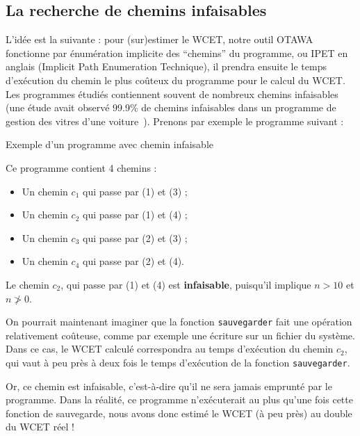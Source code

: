 \documentclass[french]{article}
\begin{document}
  \subsection{La recherche de chemins infaisables}
  L'idée est la suivante : pour (sur)estimer le WCET, notre outil OTAWA fonctionne par énumération implicite des ``chemins'' du programme, ou IPET en anglais (Implicit Path Enumeration Technique), il prendra ensuite le temps d'exécution du chemin le plus coûteux du programme pour le calcul du WCET. Les programmes étudiés contiennent souvent de nombreux chemins infaisables (une étude avait observé 99.9\% de chemins infaisables dans un programme de gestion des vitres d'une voiture~\cite{wcet05}). Prenons par exemple le programme suivant :

  \begin{algorithm}
    \label{alg:1}
    \caption{Exemple d'un programme avec chemin infaisable}
  \end{algorithm}

  Ce programme contient 4 chemins :
  \begin{itemize}
    \item Un chemin $c_1$ qui passe par (1) et (3) ;
    \item Un chemin $c_2$ qui passe par (1) et (4) ;
    \item Un chemin $c_3$ qui passe par (2) et (3) ;
    \item Un chemin $c_4$ qui passe par (2) et (4).
  \end{itemize}

  Le chemin $c_2$, qui passe par (1) et (4) est \textbf{infaisable}, puisqu'il implique $n > 10$ et $n \ngtr 0$.

  On pourrait maintenant imaginer que la fonction \texttt{sauvegarder} fait une opération relativement coûteuse, comme par exemple une écriture sur un fichier du système. Dans ce cas, le WCET calculé correspondra au temps d'exécution du chemin $c_2$, qui vaut à peu près à deux fois le temps d'exécution de la fonction \texttt{sauvegarder}.

  Or, ce chemin est infaisable, c'est-à-dire qu'il ne sera jamais emprunté par le programme. Dans la réalité, ce programme n'exécuterait au plus qu'une fois cette fonction de sauvegarde, nous avons donc estimé le WCET (à peu près) au double du WCET réel !
\end{document}

